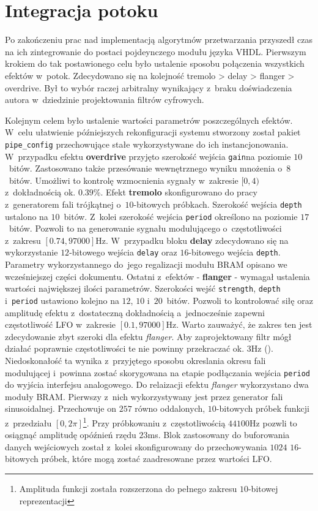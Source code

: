 \section{Integracja potoku}

Po zakończeniu prac nad implementacją algorytmów przetwarzania przyszedł czas na ich zintegrowanie do postaci pojdeynczego modułu języka VHDL. Pierwszym krokiem do tak postawionego celu było ustalenie sposobu połączenia wszystkich efektów w~potok. Zdecydowano się na kolejność tremolo > delay > flanger > overdrive. Był to wybór raczej arbitralny wynikający z~braku doświadczenia autora w~dziedzinie projektowania filtrów cyfrowych. 

Kolejnym celem było ustalenie wartości parametrów poszczególnych efektów. W~celu ułatwienie późniejszych rekonfiguracji systemu stworzony został pakiet \verb|pipe_config| przechowujące stałe wykorzystywane do ich instancjonowania. W~przypadku efektu \textbf{overdrive} przyjęto szerokość wejścia \verb|gain|na poziomie $10$~bitów. Zastosowano także przesówanie wewnętrznego wyniku mnożenia o~$8$~bitów. Umożliwi to kontrolę wzmocnienia sygnały w~zakresie $[0,4)$ z~dokładnością ok. $0.39$\%. Efekt \textbf{tremolo} skonfigurowano do pracy z~generatorem fali trójkątnej o~$10$-bitowych próbkach. Szerokość wejścia \verb|depth| ustalono na $10$~bitów. Z~kolei szerokość wejścia \verb|period| określono na poziomie $17$~bitów. Pozwoli to na generowanie sygnału modulującego o~częstotliwości z~zakresu $[0.74,97000]$Hz. W~przypadku bloku \textbf{delay} zdecydowano się na wykorzystanie $12$-bitowego wejścia \verb|delay| oraz $16$-bitowego wejścia \verb|depth|. Parametry wykorzystannego do~jego regalizacji modułu BRAM opisano we wcześniejszej części dokumentu. Ostatni z~efektów - \textbf{flanger} - wymagał ustalenia wartości największej ilości parametrów. Szerokości wejść \verb|strength|, \verb|depth| i~\verb|period| ustawiono kolejno na $12$, $10$ i~$20$~bitów. Pozwoli to kontrolować siłę oraz amplitudę efektu z~dostateczną dokładnością a~jednocześnie zapewni częstotliwość LFO w~zakresie $[0.1,97000]$Hz. Warto zauważyć, że zakres ten jest zdecydowanie zbyt szeroki dla efektu \textit{flanger}. Aby zaprojektowany filtr mógł działać poprawnie częstotliwości te nie powinny przekraczać ok. $3$Hz (\cite{flanging_analysis}). Niedoskonałość ta wynika z~przyjętego sposobu okreslania okresu fali modulującej i~powinna zostać skorygowana na etapie podłączania wejścia \verb|period| do wyjścia interfejsu analogowego. Do relaizacji efektu \textit{flanger} wykorzystano dwa moduły BRAM. Pierwszy z~nich wykorzystywany jest przez generator fali sinusoidalnej. Przechowuje on $257$ równo oddalonych, $10$-bitowych próbek funkcji z~przedziału $[0,2\pi]$\footnote{Amplituda funkcji została rozszerzona do pełnego zakresu $10$-bitowej reprezentacji}. Przy próbkowaniu z~częstotliwością $44100$Hz pozwli to osiągnąć amplitudę opóźnień rzędu $23$ms. Blok zastosowany do buforowania danych wejściowych został z~kolei skonfigurowany do przechowywania $1024$ $16$-bitowych próbek, które mogą zostać zaadresowane przez wartości LFO.

